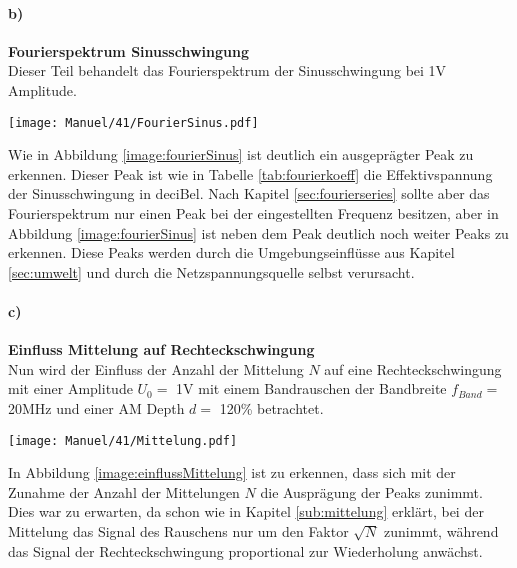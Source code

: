 \paragraph{b)}\textbf{Fourierspektrum Sinusschwingung}\\
Dieser Teil behandelt das Fourierspektrum der Sinusschwingung bei 1V Amplitude.
\begin{center}
    \texttt{[image: Manuel/41/FourierSinus.pdf]}
    \label{image:fourierSinus}
\end{center}
Wie in Abbildung \ref{image:fourierSinus} ist deutlich ein ausgeprägter Peak zu erkennen. Dieser Peak ist wie in Tabelle \ref{tab:fourierkoeff} die Effektivspannung der Sinusschwingung in deciBel. Nach Kapitel \ref{sec:fourierseries} sollte aber das Fourierspektrum nur einen Peak bei der eingestellten Frequenz besitzen, aber in Abbildung \ref{image:fourierSinus} ist neben dem Peak deutlich noch weiter Peaks zu erkennen. Diese Peaks werden durch die Umgebungseinflüsse aus Kapitel \ref{sec:umwelt} und durch die Netzspannungsquelle selbst verursacht.
\newpage
\paragraph{c)}\textbf{Einfluss Mittelung auf Rechteckschwingung}\\
Nun wird der Einfluss der Anzahl der Mittelung $N$ auf eine Rechteckschwingung mit einer Amplitude $U_0=$ 1V mit einem Bandrauschen der Bandbreite $f_{Band}=$ 20MHz und einer AM Depth $d =$ 120\% betrachtet.
\begin{center}
    \texttt{[image: Manuel/41/Mittelung.pdf]}
    \label{image:einflussMittelung}
\end{center}
In Abbildung \ref{image:einflussMittelung} ist zu erkennen, dass sich mit der Zunahme der Anzahl der Mittelungen $N$ die Ausprägung der Peaks zunimmt. Dies war zu erwarten, da schon wie in Kapitel \ref{sub:mittelung} erklärt, bei der Mittelung das Signal des Rauschens nur um den Faktor $\sqrt{N}$ zunimmt, während das Signal der Rechteckschwingung proportional zur Wiederholung anwächst.

